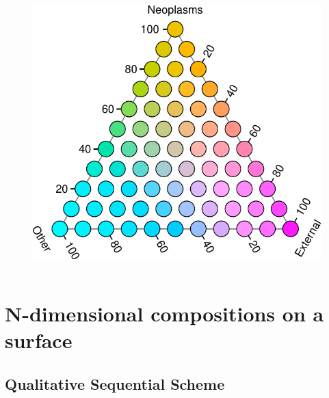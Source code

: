 \documentclass{beamer}
\begin{document}
\begin{frame}
\begin{columns}[c]
\begin{figure}[htb!]
\includegraphics[width = \textwidth]{./fig/tern_balance_lgnd.pdf}
\end{figure}

\end{columns}

\end{frame}

\section{N-dimensional compositions on a surface} %

\subsection{Qualitative Sequential Scheme}
\end{document}
